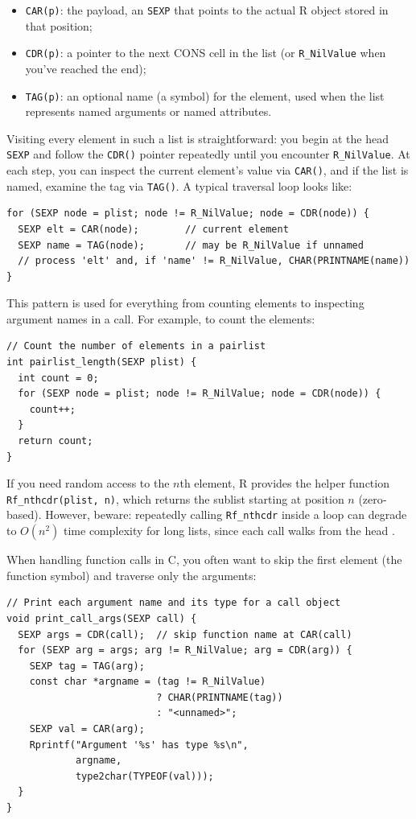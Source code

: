 \begin{itemize}
  \item \texttt{CAR(p)}: the payload, an \texttt{SEXP} that points to the actual R object stored in that position;
  \item \texttt{CDR(p)}: a pointer to the next CONS cell in the list (or \texttt{R\_NilValue} when you’ve reached the end);
  \item \texttt{TAG(p)}: an optional name (a symbol) for the element, used when the list represents named arguments or named attributes.
\end{itemize}

Visiting every element in such a list is straightforward: you begin at the head \texttt{SEXP} and follow the \texttt{CDR()} pointer repeatedly until you encounter \texttt{R\_NilValue}.  At each step, you can inspect the current element’s value via \texttt{CAR()}, and if the list is named, examine the tag via \texttt{TAG()}.  A typical traversal loop looks like:

\begin{verbatim}
for (SEXP node = plist; node != R_NilValue; node = CDR(node)) {
  SEXP elt = CAR(node);        // current element
  SEXP name = TAG(node);       // may be R_NilValue if unnamed
  // process 'elt' and, if 'name' != R_NilValue, CHAR(PRINTNAME(name))
}
\end{verbatim}

This pattern is used for everything from counting elements to inspecting argument names in a call.  For example, to count the elements:

\begin{verbatim}
// Count the number of elements in a pairlist
int pairlist_length(SEXP plist) {
  int count = 0;
  for (SEXP node = plist; node != R_NilValue; node = CDR(node)) {
    count++;
  }
  return count;
}
\end{verbatim}

If you need random access to the \(n\)th element, R provides the helper function \texttt{Rf\_nthcdr(plist, n)}, which returns the sublist starting at position \(n\) (zero‐based).  However, beware: repeatedly calling \texttt{Rf\_nthcdr} inside a loop can degrade to \(O(n^2)\) time complexity for long lists, since each call walks from the head \cite{hadley-r-internals-pairlists}.  

When handling function calls in C, you often want to skip the first element (the function symbol) and traverse only the arguments:

\begin{verbatim}
// Print each argument name and its type for a call object
void print_call_args(SEXP call) {
  SEXP args = CDR(call);  // skip function name at CAR(call)
  for (SEXP arg = args; arg != R_NilValue; arg = CDR(arg)) {
    SEXP tag = TAG(arg);
    const char *argname = (tag != R_NilValue)
                          ? CHAR(PRINTNAME(tag))
                          : "<unnamed>";
    SEXP val = CAR(arg);
    Rprintf("Argument '%s' has type %s\n",
            argname,
            type2char(TYPEOF(val)));
  }
}
\end{verbatim}

